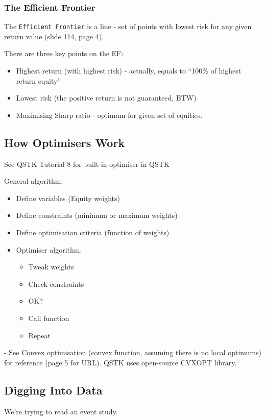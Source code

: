 \documentclass{scrartcl}
\newcommand{\term}[1]{\verb~#1~} %
\begin{document}
\subsubsection{The Efficient Frontier}
\label{sec:EfficientFrontier}
The \term{Efficient Frontier} is a line - set of points with lowest risk for any
given return value (slide 114, page 4).

There are three key points on the EF:
\begin{itemize}
\item Highest return (with highest risk) - actually, equals to ``100\% of
  highest return equity''
\item Lowest risk (the positive return is not guaranteed, BTW)
\item Maximising Sharp ratio - optimum for given set of equities.
\end{itemize}

\subsection{How Optimisers Work}
\label{sec:HowOptimisersWork}
See QSTK Tutorial 8 for built-in optimiser in QSTK

General algorithm:
\begin{itemize}
\item Define variables (Equity weights)
\item Define constraints (minimum or maximum weights)
\item Define optimisation criteria (function of weights)
\item Optimiser algorithm:
  \begin{itemize}
  \item Tweak weights
  \item Check constraints
  \item OK?
  \item Call function
  \item Repeat
  \end{itemize}
\end{itemize}

- See Convex optimisation (convex function, assuming there is no local optimums)
for reference (page 5 for URL). QSTK uses open-source CVXOPT library.

\subsection{Digging Into Data}
\label{sec:DiggingIntoData}
We're trying to read an event study.
\end{document}
